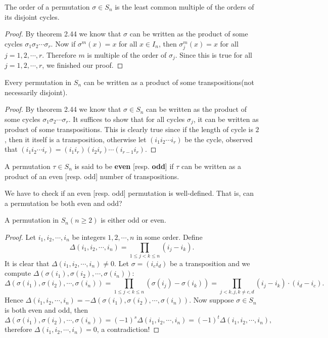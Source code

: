 \begin{corollary}
The order of a permutation $\sigma\in S_n$ is the least common multiple of the orders of its disjoint cycles.
\end{corollary}
\begin{proof}
By theorem 2.44 we know that $\sigma$ can be written as the product of some cycles $\sigma_1\sigma_2\cdots\sigma_r$. Now if $\sigma^m(x)=x$ for all $x\in I_n$, then $\sigma_j^m(x)=x$ for all $j=1,2,\cdots,r$. Therefore $m$ is multiple of the order of $\sigma_j$. Since this is true for all $j=1,2,\cdots,r$, we finished our proof.
\end{proof}
\begin{corollary}
Every permutation in $S_n$ can be written as a product of some transpositions(not necessarily disjoint).
\end{corollary}
\begin{proof}
By theorem 2.44 we know that $\sigma\in S_n$ can be written as the product of some cycles $\sigma_1\sigma_2\cdots\sigma_r$. It suffices to show that for all cycles $\sigma_j$, it can be written as product of some transpositions. This is clearly true since if the length of cycle is $2$, then it itself is a transposition, otherwise let $(i_1i_2\cdots i_r)$ be the cycle, observed that $(i_1i_2\cdots i_r)=(i_1i_r)(i_2i_r)\cdots(i_{r-1}i_r)$.
\end{proof}
\begin{definition}
A permutation $\tau\in S_n$ is said to be \textbf{even} [resp. \textbf{odd}] if $\tau$ can be written as a product of an even [resp. odd] number of transpositions.
\end{definition}
We have to check if an even [resp. odd] permutation is well-defined. That is, can a permutation be both even and odd?
\begin{theorem}
A permutation in $S_n(n\ge 2)$ is either odd or even.
\end{theorem}
\begin{proof}
Let $i_1,i_2,\cdots,i_n$ be integers $1,2,\cdots,n$ in some order. Define 
$$
\Delta \left( i_1,i_2,\cdots ,i_n \right) =\prod_{1\le j<k\le n}{\left( i_j-i_k \right)}.
$$
It is clear that $\Delta(i_1,i_2,\cdots,i_n)\ne 0$. Let $\sigma=(i_ci_d)$ be a transposition and we compute $\Delta(\sigma(i_1),\sigma(i_2),\cdots,\sigma(i_n))$:
$$
\Delta \left( \sigma \left( i_1 \right) ,\sigma \left( i_2 \right) ,\cdots ,\sigma \left( i_n \right) \right) =\prod_{1\le j<k\le n}{\left( \sigma \left( i_j \right) -\sigma \left( i_k \right) \right)}=\prod_{j<k,j,k\ne c,d}{\left( i_j-i_k \right)}\cdot \left( i_d-i_c \right) .
$$
Hence $\Delta(i_1,i_2,\cdots,i_n)=-\Delta(\sigma(i_1),\sigma(i_2),\cdots,\sigma(i_n))$. Now suppose $\sigma\in S_n$ is both even and odd, then 
$$
\Delta \left( \sigma \left( i_1 \right) ,\sigma \left( i_2 \right) ,\cdots ,\sigma \left( i_n \right) \right) =\left( -1 \right) ^s\Delta \left( i_1,i_2,\cdots ,i_n \right) =\left( -1 \right) ^t\Delta \left( i_1,i_2,\cdots ,i_n \right) ,
$$
therefore $\Delta(i_1,i_2,\cdots,i_n)=0$, a contradiction!
\end{proof}

